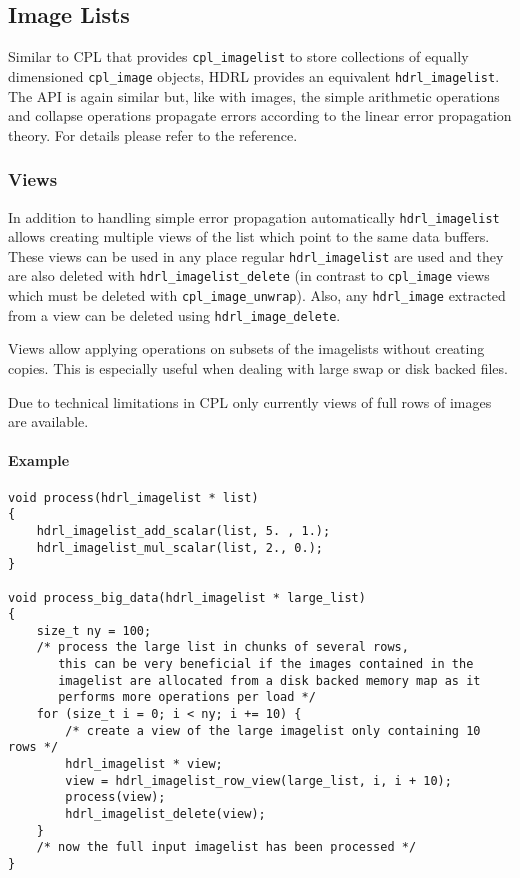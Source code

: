 \subsection{Image Lists}
Similar to CPL that provides \verb+cpl_imagelist+ to store collections
of equally dimensioned \verb+cpl_image+ objects, HDRL provides an
equivalent \verb+hdrl_imagelist+.  The API is again similar but, like
with images, the simple arithmetic operations and collapse operations
propagate errors according to the linear error propagation theory.  For
details please refer to the reference.

\subsubsection{Views}
In addition to handling simple error propagation automatically
\verb+hdrl_imagelist+ allows creating multiple views of the list which point to
the same data buffers.
These views can be used in any place regular \verb+hdrl_imagelist+ are used and
they are also deleted with \verb+hdrl_imagelist_delete+ (in contrast to
\verb+cpl_image+ views which must be deleted with \verb+cpl_image_unwrap+).
Also, any \verb+hdrl_image+ extracted from a view can be deleted using \verb+hdrl_image_delete+.   

Views allow applying operations on subsets of the imagelists without creating
copies.
This is especially useful when dealing with large swap or disk backed files.

Due to technical limitations in CPL only currently views of full rows of images
are available.

\paragraph{Example}
\begin{lstlisting}
void process(hdrl_imagelist * list)
{
    hdrl_imagelist_add_scalar(list, 5. , 1.);
    hdrl_imagelist_mul_scalar(list, 2., 0.);
}

void process_big_data(hdrl_imagelist * large_list)
{
    size_t ny = 100;
    /* process the large list in chunks of several rows,
       this can be very beneficial if the images contained in the
       imagelist are allocated from a disk backed memory map as it
       performs more operations per load */
    for (size_t i = 0; i < ny; i += 10) {
        /* create a view of the large imagelist only containing 10 rows */
        hdrl_imagelist * view;
        view = hdrl_imagelist_row_view(large_list, i, i + 10);
        process(view);
        hdrl_imagelist_delete(view);
    }
    /* now the full input imagelist has been processed */
}
\end{lstlisting}

